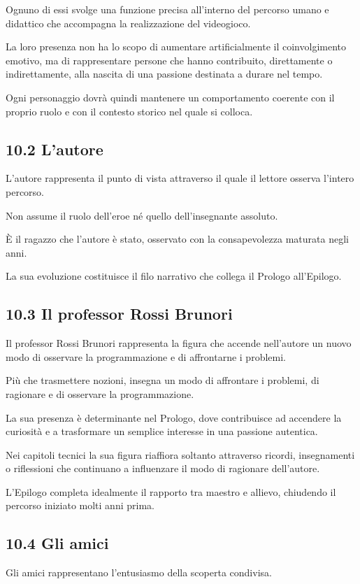 \documentclass{article}
\begin{document}
Ognuno di essi svolge una funzione precisa all'interno del percorso umano e didattico che accompagna la realizzazione
del videogioco.

La loro presenza non ha lo scopo di aumentare artificialmente il coinvolgimento emotivo, ma di rappresentare persone che
hanno contribuito, direttamente o indirettamente, alla nascita di una passione destinata a durare nel tempo.

Ogni personaggio dovrà quindi mantenere un comportamento coerente con il proprio ruolo e con il contesto storico nel
quale si colloca.

\subsection[10.2 L{}'autore]{10.2 L'autore}
L'autore rappresenta il punto di vista attraverso il quale il lettore osserva l'intero percorso.

Non assume il ruolo dell'eroe né quello dell'insegnante assoluto.

È il ragazzo che l'autore è stato, osservato con la consapevolezza maturata negli anni.

La sua evoluzione costituisce il filo narrativo che collega il Prologo all'Epilogo.

\subsection{10.3 Il professor Rossi Brunori}
Il professor Rossi Brunori rappresenta la figura che accende nell'autore un nuovo modo di osservare la programmazione e
di affrontarne i problemi.

Più che trasmettere nozioni, insegna un modo di affrontare i problemi, di ragionare e di osservare la programmazione.

La sua presenza è determinante nel Prologo, dove contribuisce ad accendere la curiosità e a trasformare un semplice
interesse in una passione autentica.

Nei capitoli tecnici la sua figura riaffiora soltanto attraverso ricordi, insegnamenti o riflessioni che continuano a
influenzare il modo di ragionare dell'autore.

L'Epilogo completa idealmente il rapporto tra maestro e allievo, chiudendo il percorso iniziato molti anni prima.

\subsection{10.4 Gli amici}
Gli amici rappresentano l'entusiasmo della scoperta condivisa.
\end{document}
